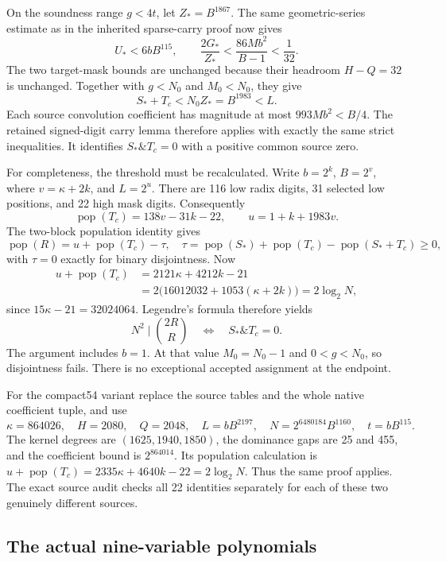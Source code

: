 On the soundness range $g<4t$, let $Z_*=B^{1867}$.
The same geometric-series estimate as in the inherited sparse-carry proof
now gives
\[
 U_*<6bB^{115},\qquad
 \frac{2G_*}{Z_*}<\frac{86Mb^2}{B-1}<\frac1{32}.
\]
The two target-mask bounds are unchanged because their headroom $H-Q=32$
is unchanged.  Together with $g<N_0$ and $M_0<N_0$, they give
\[
 S_*+T_c<N_0Z_*=B^{1983}<L.
\]
Each source convolution coefficient has magnitude at most
$993Mb^2<B/4$.  The retained signed-digit carry lemma therefore applies
with exactly the same strict inequalities.  It identifies
$S_*\mathbin{\&}T_c=0$ with a positive common source zero.

For completeness, the threshold must be recalculated.  Write
$b=2^k$, $B=2^v$, where $v=\kappa+2k$, and $L=2^u$.
There are 116 low radix digits, 31 selected low positions, and 22 high
mask digits.  Consequently
\[
 \operatorname{pop}(T_c)=138v-31k-22,\qquad
 u=1+k+1983v.
\]
The two-block population identity gives
\[
 \operatorname{pop}(R)=u+\operatorname{pop}(T_c)-\tau,
 \quad
 \tau=\operatorname{pop}(S_*)+\operatorname{pop}(T_c)
       -\operatorname{pop}(S_*+T_c)\ge0,
\]
with $\tau=0$ exactly for binary disjointness.  Now
\begin{align*}
 u+\operatorname{pop}(T_c)
   &=2121\kappa+4212k-21\\
   &=2\bigl(16012032+1053(\kappa+2k)\bigr)
     =2\log_2N,
\end{align*}
since $15\kappa-21=32024064$.
Legendre's formula therefore yields
\begin{equation}
 N^2\mid\binom{2R}{R}
 \quad\Longleftrightarrow\quad S_*\mathbin{\&}T_c=0.
 \label{eq:origin-calibration}
\end{equation}
The argument includes $b=1$.  At that value $M_0=N_0-1$ and
$0<g<N_0$, so disjointness fails.  There is no exceptional accepted
assignment at the endpoint.

For the compact54 variant replace the source tables and the whole native
coefficient tuple, and use
\[
 \kappa=864026,\quad H=2080,\quad Q=2048,\quad
 L=bB^{2197},\quad N=2^{6480184}B^{1160},\quad t=bB^{115}.
\]
The kernel degrees are $(1625,1940,1850)$, the dominance gaps are 25 and
455, and the coefficient bound is $2^{864014}$.  Its population calculation
is $u+\operatorname{pop}(T_c)=2335\kappa+4640k-22=2\log_2N$.
Thus the same proof applies.  The exact source audit checks all 22
identities separately for each of these two genuinely different sources.

\subsection{The actual nine-variable polynomials}

